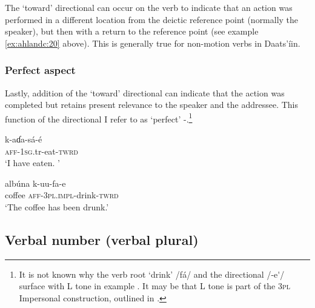 \documentclass[output=paper]{langsci/langscibook}
\begin{document}
The ‘toward’ directional can occur on the verb to indicate that an action was performed in a different location from the deictic reference point (normally the speaker), but then with a return to the reference point (see example \ref{ex:ahlandc:20} above). This is generally true for non-motion verbs in Daats’\'{i}in.

\subsubsection{Perfect aspect}\label{sec:ahlandc:4.6.3}

Lastly, addition of the ‘toward’ directional can indicate that the action was completed but retains present relevance to the speaker and the addressee. This function of the directional I refer to as ‘perfect’ -.\footnote{It is not known why the verb root ‘drink’ /f\'{a}/ and the directional /-e\'{ }/ surface with L tone in example .  It may be that L tone is part of the 3\textsc{pl} Impersonal construction, outlined in .}

\ea\label{ex:ahlandc:34}
\gll
k-aɗa-s\'{a}-\'{e}  \\
\textsc{aff-1sg}.tr{}-eat-\textsc{twrd} \\
\glt
‘I have eaten. ’
\z

\ea\label{ex:ahlandc:35}
\gll
alb\'{u}na k-uu-fa-e \\
coffee \textsc{aff-3pl.impl}{}-drink-\textsc{twrd} \\
\glt
‘The coffee has been drunk.’
\z


\subsection{Verbal number (verbal plural)}\label{sec:ahlandc:4.7}
\end{document}

